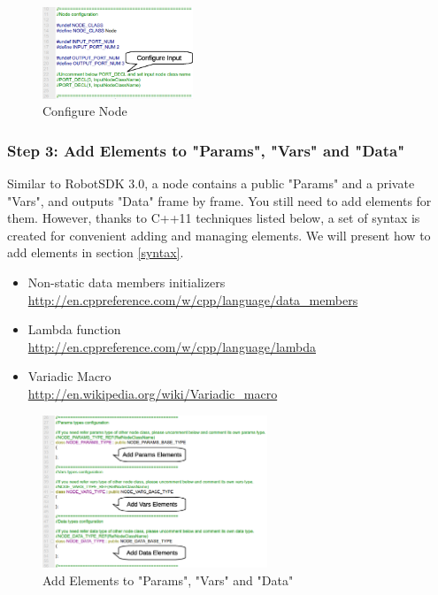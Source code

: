 \documentclass[a4paper,10pt]{book}
\begin{document}
\begin{figure}
 \centering
 \includegraphics[width=0.4\textwidth]{img/header2.eps}
 \caption{Configure Node}
 \label{fig:header2}
\end{figure}

\subsubsection{Step 3: Add Elements to "Params", "Vars" and "Data"}

Similar to RobotSDK 3.0, a node contains a public "Params" and a private "Vars", and outputs "Data" frame by frame. You still need to add elements for them. However, thanks to C++11 techniques listed below, a set of syntax is created for convenient adding and managing elements. We will present how to add elements in section \ref{syntax}.

\begin{itemize}
 \item Non-static data members initializers \\
 \url{http://en.cppreference.com/w/cpp/language/data_members}
 \item Lambda function \\
 \url{http://en.cppreference.com/w/cpp/language/lambda}
 \item Variadic Macro \\
 \url{http://en.wikipedia.org/wiki/Variadic_macro}
\end{itemize}

\begin{figure}
 \centering
 \includegraphics[width=0.6\textwidth]{img/header3.eps}
 \caption{Add Elements to "Params", "Vars" and "Data"}
 \label{fig:header3}
\end{figure}
\end{document}
